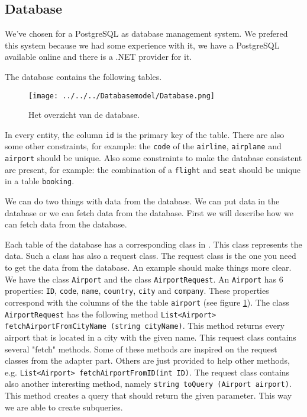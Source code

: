 
\subsection{Database}
We've chosen for a PostgreSQL as database management system. We prefered this system because we had some experience with it, we have a PostgreSQL available online and there is a .NET provider for it.

The database contains the following tables.
\begin{figure}[H]
	\centering
	\texttt{[image: ../../../Databasemodel/Database.png]}
	\caption{Het overzicht van de database.}
	\label{fig:database_design}
\end{figure}
In every entity, the column \texttt{id} is the primary key of the table. There are also some other constraints, for example: the \texttt{code} of the \texttt{airline}, \texttt{airplane} and \texttt{airport} should be unique. Also some constraints to make the database consistent are present, for example: the combination of a \texttt{flight} and \texttt{seat} should be unique in a table \texttt{booking}. 

We can do two things with data from the database. We can put data in the database or we can fetch data from the database. First we will describe how we can fetch data from the database.

Each table of the database has a corresponding class in \Csh. This class represents the  data. Such a class has also a request class. The request class is the one you need to get the data from the database. An example should make things more clear. We have the class \texttt{Airport} and the class \texttt{AirportRequest}. An \texttt{Airport} has 6 properties: \texttt{ID}, \texttt{code}, \texttt{name}, \texttt{country}, \texttt{city} and  \texttt{company}. These properties correspond with the columns of the the table \texttt{airport} (see figure \ref{fig:database_design}). The class \texttt{AirportRequest} has the following method \texttt{List<Airport> fetchAirportFromCityName (string cityName)}. This method returns every airport that is located in a city with the given name. This request class contains several "fetch" methods. Some of these methods are inspired on the request classes from the adapter part. Others are just provided to help other methods, e.g. \texttt{List<Airport> fetchAirportFromID(int ID)}. The request class contains also another interesting method, namely \texttt{string toQuery (Airport airport)}. This method creates a query that should return the given parameter. This way we are able to create subqueries.

